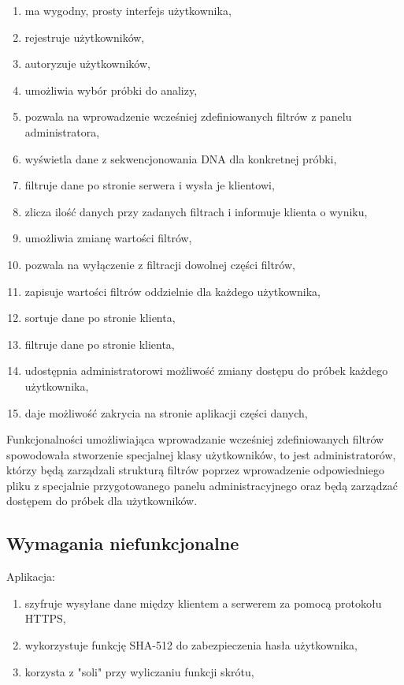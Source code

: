 \documentclass[a4paper,12pt,twoside]{article}
\begin{document}
 \begin{enumerate}[1)]
 \item ma wygodny, prosty interfejs użytkownika,
 \item rejestruje użytkowników,
 \item autoryzuje użytkowników,
 \item umożliwia wybór próbki do analizy,
 \item pozwala na wprowadzenie wcześniej zdefiniowanych filtrów z panelu administratora,
 \item wyświetla dane z sekwencjonowania DNA dla konkretnej próbki,
 \item filtruje dane po stronie serwera i wysła je klientowi,
 \item zlicza ilość danych przy zadanych filtrach i informuje klienta o wyniku,
 \item umożliwia zmianę wartości filtrów,
 \item pozwala na wyłączenie z filtracji dowolnej części filtrów,
 \item zapisuje wartości filtrów oddzielnie dla każdego użytkownika,
 \item sortuje dane po stronie klienta,
 \item filtruje dane po stronie klienta,
 \item udostępnia administratorowi możliwość zmiany dostępu do próbek 
 każdego użytkownika,
 \item daje możliwość zakrycia na stronie aplikacji części danych,	
 \end{enumerate}
 
Funkcjonalności umożliwiająca wprowadzanie wcześniej zdefiniowanych filtrów spowodowała stworzenie
specjalnej klasy użytkowników, to jest administratorów, którzy będą zarządzali strukturą filtrów poprzez wprowadzenie odpowiedniego pliku z specjalnie przygotowanego panelu administracyjnego
oraz będą zarządzać dostępem do próbek dla użytkowników.

\subsection{Wymagania niefunkcjonalne}
Aplikacja:
 \begin{enumerate}[1)]
  \item szyfruje wysyłane dane między klientem a serwerem za pomocą protokołu HTTPS,
  \item wykorzystuje funkcję SHA-512 do zabezpieczenia hasła użytkownika,
  \item korzysta z "soli" przy wyliczaniu funkcji skrótu,
 \end{enumerate}
\end{document}
